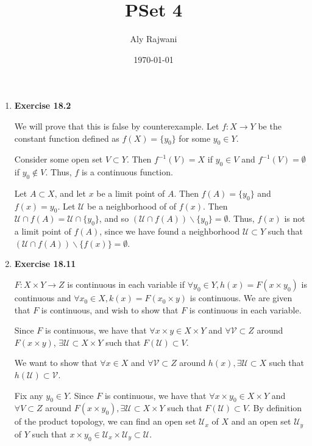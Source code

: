 \documentclass{article}
\title{PSet 4}
\author{Aly Rajwani}
\date{\today}
\newcommand{\U}{\mathcal{U}}
\newcommand{\V}{\mathcal{V}}
\newcommand{\sk}{\smallskip}
\begin{document}
\maketitle

\begin{enumerate}
    \item \textbf{Exercise 18.2}
    
    We will prove that this is false by counterexample. Let $f: X \rightarrow Y$ be the constant function defined as $f(X) = \{y_0\}$ for some $y_0 \in Y$. 
    
    \sk
    
    Consider some open set $V \subset Y$. Then $f^{-1}(V) = X$ if $y_0 \in V$ and $f^{-1}(V) = \emptyset$ if $y_0 \notin V$. Thus, $f$ is a continuous function. 
    
    \sk
    
    Let $A \subset X$, and let $x$ be a limit point of $A$. Then $f(A) = \{y_0\}$ and $f(x) = y_0$. Let $\U$ be a neighborhood of of $f(x)$. Then $\U \cap f(A) = \U \cap \{y_0\}$, and so $(\U \cap f(A))\backslash \{y_0\} = \emptyset$. Thus, $f(x)$ is not a limit point of $f(A)$, since we have found a neighborhood $\U \subset Y$ such that $\left(\U \cap f\left(A\right)\right)\backslash\{f(x)\} = \emptyset$.
    
    \item \textbf{Exercise 18.11}

    $F: X \times Y \rightarrow Z$ is continuous in each variable if $\forall y_0 \in Y, h(x) = F(x \times y_0)$ is continuous and $\forall x_0 \in X, k(x) = F(x_0 \times y)$ is continuous. We are given that $F$ is continuous, and wish to show that $F$ is continuous in each variable. 

    \sk
    
    Since $F$ is continuous, we have that $\forall x\times y \in X \times Y$ and $\forall \V \subset Z$ around $F(x\times y)$, $\exists \U \subset X \times Y$ such that $F(\U) \subset V$. 

    \sk

    We want to show that $\forall x \in X$ and $\forall \V \subset Z$ around $h(x), \exists \U \subset X$ such that $h(\U) \subset \V$.

    \sk

    Fix any $y_0 \in Y$. Since $F$ is continuous, we have that $\forall x \times y_0 \in X \times Y$ and $\forall V \subset Z$ around $F(x \times y_0), \exists \U \subset X \times Y$ such that $F(\U) \subset V$. By definition of the product topology, we can find an open set $\U_x$ of $X$ and an open set $\U_y$ of $Y$ such that $x \times y_0 \in \U_x \times \U_y \subset \U$.


\end{enumerate}
\end{document}
